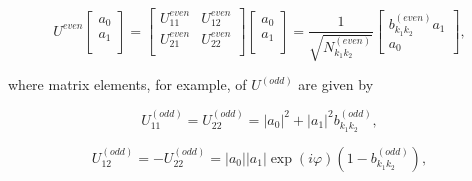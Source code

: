 \documentclass{optica-article}
\begin{document}
\begin{equation}\label{eq:11}
U^{even}\begin{bmatrix}
        a_0 \\
        a_1 \\
      \end{bmatrix} = 
      \begin{bmatrix}
        U^{even}_{11} & U^{even}_{12}  \\
        U^{even}_{21} & U^{even}_{22}  \\
      \end{bmatrix}
      \begin{bmatrix}
        a_0 \\
        a_1 \\
      \end{bmatrix} = 
      \frac{1}{\sqrt{N^{(even)}_{k_1k_2}}}
        \begin{bmatrix}
        b^{(even)}_{k_1k_2}a_1 \\
        a_0
      \end{bmatrix},      
\end{equation}


\!\!\!\!\!\!where matrix elements, for example, of $U^{(odd)}$ are given by


\begin{equation}
    U_{11}^{(odd)} = U_{22}^{(odd)} = \lvert a_0 \rvert^2 + \lvert a_1 \rvert^2 b^{(odd)}_{k_1k_2}, \nonumber     
\end{equation}

\begin{equation}\label{eq:12}
    U_{12}^{(odd)} = -U_{22}^{(odd)} = \lvert a_0 \rvert\lvert a_1 \rvert \exp(i\varphi) (1 - b^{(odd)}_{k_1k_2}),      
\end{equation}
\end{document}
